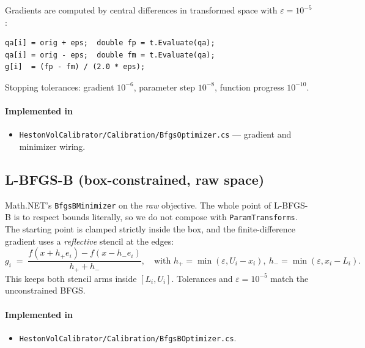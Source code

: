 \documentclass[11pt,a4paper]{article}
\begin{document}
Gradients are computed by central differences in transformed space with
$\varepsilon = 10^{-5}$:
\begin{lstlisting}
qa[i] = orig + eps;  double fp = t.Evaluate(qa);
qa[i] = orig - eps;  double fm = t.Evaluate(qa);
g[i]  = (fp - fm) / (2.0 * eps);
\end{lstlisting}
Stopping tolerances: gradient $10^{-6}$, parameter step $10^{-8}$,
function progress $10^{-10}$.

\paragraph*{Implemented in}
\begin{itemize}
\item \texttt{HestonVolCalibrator/Calibration/BfgsOptimizer.cs} --- gradient and minimizer wiring.
\end{itemize}

\subsection{L-BFGS-B (box-constrained, raw space)}
\label{sec:bfgsb}
Math.NET's \texttt{BfgsBMinimizer} on the \emph{raw} objective. The whole point
of L-BFGS-B is to respect bounds literally, so we do not compose with
\texttt{ParamTransforms}. The starting point is clamped strictly inside the box,
and the finite-difference gradient uses a \emph{reflective} stencil at the edges:
\[
g_i \;=\; \frac{f(x + h_+ e_i) - f(x - h_- e_i)}{h_+ + h_-},\quad
\text{with } h_+ = \min(\varepsilon, U_i - x_i),\ h_- = \min(\varepsilon, x_i - L_i).
\]
This keeps both stencil arms inside $[L_i, U_i]$. Tolerances and $\varepsilon = 10^{-5}$
match the unconstrained BFGS.

\paragraph*{Implemented in}
\begin{itemize}
\item \texttt{HestonVolCalibrator/Calibration/BfgsBOptimizer.cs}.
\end{itemize}
\end{document}
